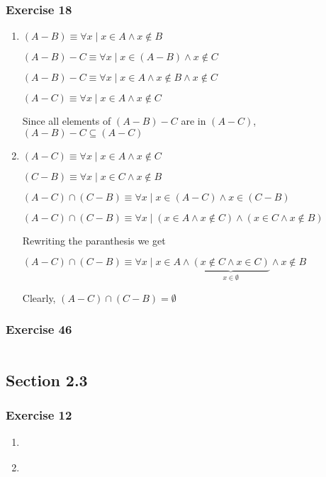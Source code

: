 \documentclass[a4paper]{article}
\newcommand{\ex}[1]{\subsubsection*{#1}}
\begin{document}
\ex{Exercise 18}
\begin{enumerate}[label=\alph*), start=3]
    \item{ 
        \( (A-B) \equiv \forall x \mid x \in A \land x \notin B \)

        \( (A-B) -C \equiv \forall x \mid x \in (A-B) \land x \notin C \)

        \( (A-B) -C \equiv \forall x \mid x \in A \land x \notin B \land x \notin C \)

        \( (A-C) \equiv \forall x \mid x \in A \land x \notin C \)

        Since all elements of \( (A-B)-C \) are in \( (A-C) \), 
            \( (A-B)-C \subseteq (A-C) \)
    }

    \item{ 
        \( (A-C) \equiv \forall x \mid x \in A \land x \notin C \)

        \( (C-B) \equiv \forall x \mid x \in C \land x \notin B \)

        \( (A-C) \cap (C-B) \equiv \forall x \mid x \in (A-C) \land x \in (C-B) \)

        \( (A-C) \cap (C-B) \equiv \forall x \mid (x \in A \land x \notin C) \land 
            (x \in C \land x \notin B) \)

        Rewriting the paranthesis we get 

        \( (A-C) \cap (C-B) \equiv \forall x \mid x \in A \land 
            \underbrace{(x \notin C \land x \in C)}_{x \in \emptyset} \land x \notin B \)

        Clearly, \( (A-C) \cap (C-B) = \emptyset \)

    }
\end{enumerate}


\ex{Exercise 46}

\( \)



\vspace{2em}
\subsection*{Section 2.3}
\vspace{1em}

\ex{Exercise 12}
\begin{enumerate}[label=\alph*)]
    \item{
    }

    \item{
    }
\end{enumerate}
\end{document}

